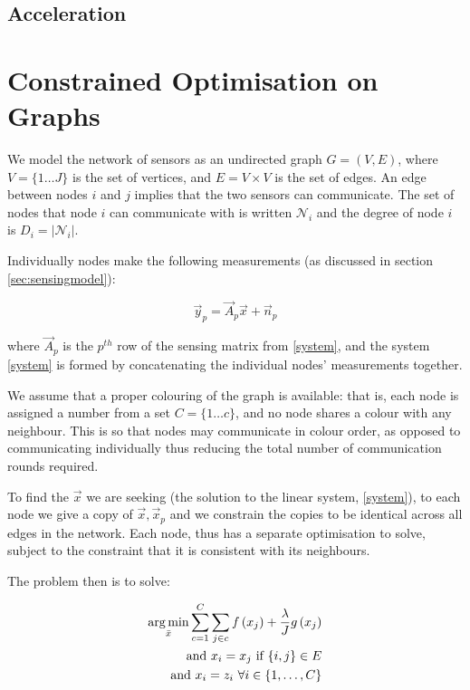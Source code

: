 \documentclass{article}
\begin{document}
\subsection{Acceleration}


\section{Constrained Optimisation on Graphs}\label{sec:opt-on-graphs}

We model the network of sensors as an undirected graph \(G = \left(V,E\right)\), where \(V = \{1 \ldots J\}\) is the set of vertices, and \(E = V \times V\) is the set of edges. An edge between nodes \(i\) and \(j\) implies that the two sensors can communicate. The set of nodes that node \(i\) can communicate with is written \(\mathcal{N}_i\) and the degree of node \(i\) is \(D_i = |\mathcal{N}_i|\). 

Individually nodes make the following measurements (as discussed in section \ref{sec:sensingmodel}):

\begin{equation}
\vec{y}_p = \vec{A}_p\vec{x} + \vec{n}_p
\end{equation}

where \(\vec{A}_p\) is the \(p^{th} \) row of the sensing matrix from \eqref{system}, and the system \eqref{system} is formed by concatenating the individual nodes' measurements together.

We assume that a proper colouring of the graph is available: that is, each node is assigned a number from a set \(C = \{1 \ldots c \} \), and no node shares a colour with any neighbour. This is so that nodes may communicate in colour order, as opposed to communicating individually thus reducing the total number of communication rounds required. 

To find the \(\vec{x}\) we are seeking (the solution to the linear system, \ref{system}), to each node we give a copy of \(\vec{x}, \vec{x}_p\) and we constrain the copies to be identical across all edges in the network. Each node, thus has a separate optimisation to solve, subject to the constraint that it is consistent with its neighbours.

The problem then is to solve:

\begin{align}
\operatorname*{arg\,min}_{\bar{x}} \sum_{c=1}^C \sum_{j \in c} f\left(x_j\right) + \frac{\lambda}{J} g\left(x_j\right) \nonumber \\ 
\text{ and } x_i = x_j \text{ if } \{i,j\} \in E \nonumber \\
\text{ and } x_i = z_i \text{ } \forall i \in \{1, \ldots, C\}
\label{constrainedbp}
\end{align}
\end{document}
